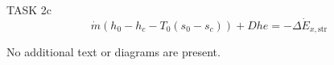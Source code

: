 TASK 2c  
\[
\dot{m} \left( h_0 - h_c - T_0 \left( s_0 - s_c \right) \right) + Dhe = -\Delta \dot{E}_{x,\text{str}}
\]  

No additional text or diagrams are present.